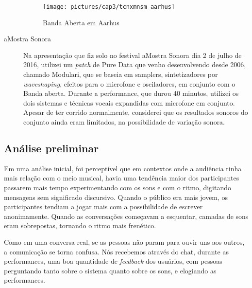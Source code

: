 \begin{description}
\begin{figure}
        \texttt{[image: pictures/cap3/tcnxmnsm\_aarhus]}
        \vspace{-10pt}
    \caption{Banda Aberta em Aarhus}
    \label{fig:tcnxmnsm}
\end{figure}



\item[aMostra Sonora]
Na apresentação que fiz solo no festival aMostra Sonora dia 2 de julho de 2016, utilizei um \emph{patch} de Pure Data que venho desenvolvendo desde 2006, chamado Modulari, que se baseia em samplers, sintetizadores por \emph{waveshaping}, efeitos para o microfone e osciladores, em conjunto com o Banda aberta. Durante a performance, que durou 40 minutos, utilizei os dois sistemas e técnicas vocais expandidas com microfone em conjunto. Apesar de ter corrido normalmente, considerei que os resultados sonoros do conjunto ainda eram limitados, na possibilidade de variação sonora.




\end{description}



\subsection{Análise preliminar}

Em uma análise inicial, foi perceptível que em contextos onde a audiência tinha mais relação com o meio musical, havia uma tendência maior dos participantes passarem mais tempo experimentando com os sons e com o ritmo, digitando mensagens sem significado discursivo. Quando o público era mais jovem, os participantes tendiam a jogar mais com a possibilidade de escrever anonimamente. Quando as conversações começavam a esquentar, camadas de sons eram sobrepostas, tornando o ritmo mais frenético.

Como em uma conversa real, se as pessoas não param para ouvir uns aos outros, a comunicação se torna confusa. Nós recebemos através do chat, durante as performances, uma boa quantidade de \emph{feedback} dos usuários, com pessoas perguntando tanto sobre o sistema quanto sobre os sons, e elogiando as performances.


